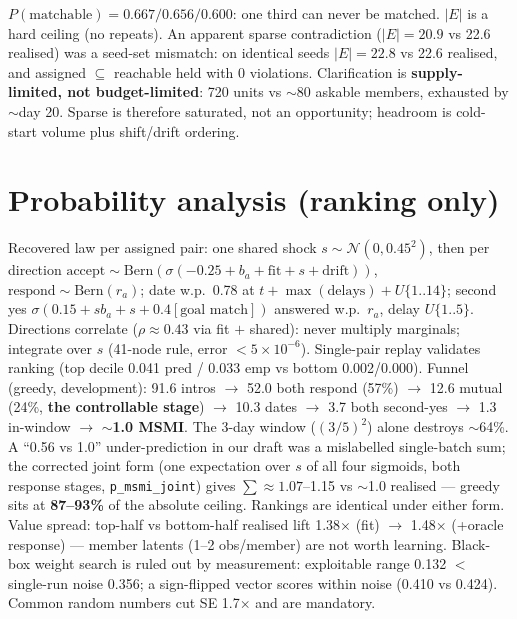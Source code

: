 \documentclass[11pt,a4paper]{article}
\begin{document}
$P(\text{matchable})=0.667/0.656/0.600$: one third can never be matched.
$|E|$ is a hard ceiling (no repeats). An apparent sparse contradiction
($|E|=20.9$ vs 22.6 realised) was a seed-set mismatch: on identical seeds
$|E|=22.8$ vs 22.6 realised, and assigned $\subseteq$ reachable held with 0
violations. Clarification is \textbf{supply-limited, not budget-limited}:
720 units vs $\sim$80 askable members, exhausted by $\sim$day 20. Sparse is
therefore saturated, not an opportunity; headroom is cold-start volume plus
shift/drift ordering.

\section{Probability analysis (ranking only)}
Recovered law per assigned pair: one shared shock
$s\sim\mathcal{N}(0,0.45^2)$, then per direction
$\text{accept}\sim\text{Bern}(\sigma(-0.25+b_a+\mathrm{fit}+s+\mathrm{drift}))$,
$\text{respond}\sim\text{Bern}(r_a)$; date w.p.\ 0.78 at
$t+\max(\text{delays})+U\{1..14\}$; second yes
$\sigma(0.15+sb_a+s+0.4[\text{goal match}])$ answered w.p.\ $r_a$, delay
$U\{1..5\}$. Directions correlate ($\rho\approx0.43$ via fit $+$ shared): never
multiply marginals; integrate over $s$ (41-node rule, error $<5{\times}10^{-6}$).
Single-pair replay validates ranking (top decile 0.041 pred / 0.033 emp vs
bottom 0.002/0.000). Funnel (greedy, development): 91.6 intros $\to$ 52.0 both
respond (57\%) $\to$ 12.6 mutual (24\%, \textbf{the controllable stage}) $\to$
10.3 dates $\to$ 3.7 both second-yes $\to$ 1.3 in-window $\to$ \textbf{$\sim$1.0
MSMI}. The 3-day window ($(3/5)^2$) alone destroys $\sim$64\%. A ``0.56 vs
1.0'' under-prediction in our draft was a mislabelled single-batch sum; the
corrected joint form (one expectation over $s$ of all four sigmoids, both
response stages, \texttt{p\_msmi\_joint}) gives $\sum\approx1.07$--1.15 vs
$\sim$1.0 realised --- greedy sits at \textbf{87--93\%} of the absolute
ceiling. Rankings are identical under either form. Value spread: top-half vs
bottom-half realised lift 1.38$\times$ (fit) $\to$ 1.48$\times$ (+oracle
response) --- member latents (1--2 obs/member) are not worth learning.
Black-box weight search is ruled out by measurement: exploitable range 0.132
$<$ single-run noise 0.356; a sign-flipped vector scores within noise
(0.410 vs 0.424). Common random numbers cut SE 1.7$\times$ and are mandatory.
\end{document}
